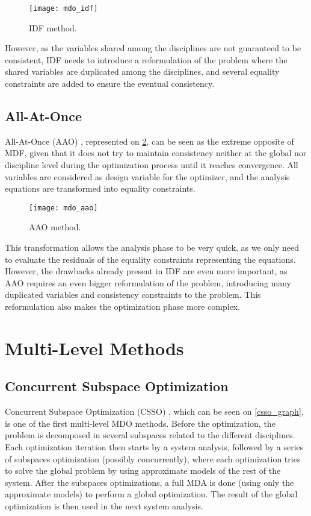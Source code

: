 \begin{figure}
\centering
\texttt{[image: mdo\_idf]}
\caption{IDF method.}\label{idf_graph}
\end{figure}

However, as the variables shared among the disciplines are not guaranteed to be consistent, IDF needs to introduce a reformulation of the problem where the shared variables are duplicated among the disciplines, and several equality constraints are added to ensure the eventual consistency.

\subsection{All-At-Once}

All-At-Once (AAO) \cite{haftka1985simultaneous, cramer1994problem}, represented on \figurename{} \ref{aao_graph}, can be seen as the extreme opposite of MDF, given that it does not try to maintain consistency neither at the global nor discipline level during the optimization process until it reaches convergence.
All variables are considered as design variable for the optimizer, and the analysis equations are transformed into equality constraints.

\begin{figure}
\centering
\texttt{[image: mdo\_aao]}
\caption{AAO method.}\label{aao_graph}
\end{figure}

This transformation allows the analysis phase to be very quick, as we only need to evaluate the residuals of the equality constraints representing the equations.
However, the drawbacks already present in IDF are even more important, as AAO requires an even bigger reformulation of the problem, introducing many duplicated variables and consistency constraints to the problem. This reformulation also makes the optimization phase more complex.

\section{Multi-Level Methods}

\subsection{Concurrent Subspace Optimization}

Concurrent Subspace Optimization (CSSO) \cite{wujek1997concurrent}, which can be seen on \figurename{} \ref{csso_graph}, is one of the first multi-level MDO methods. Before the optimization, the problem is decomposed in several subspaces related to the different disciplines. Each optimization iteration then starts by a system analysis, followed by a series of subspaces optimization (possibly concurrently), where each optimization tries to solve the global problem by using approximate models of the rest of the system. After the subspaces optimizations, a full MDA is done (using only the approximate models) to perform a global optimization. The result of the global optimization is then used in the next system analysis.

